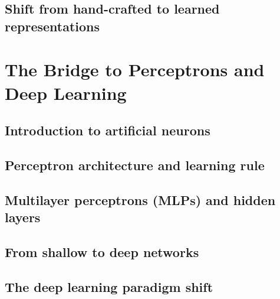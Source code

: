 \subsection{Shift from hand-crafted to learned representations}

\section{The Bridge to Perceptrons and Deep Learning}
\subsection{Introduction to artificial neurons}
\subsection{Perceptron architecture and learning rule}
\subsection{Multilayer perceptrons (MLPs) and hidden layers}
\subsection{From shallow to deep networks}
\subsection{The deep learning paradigm shift}